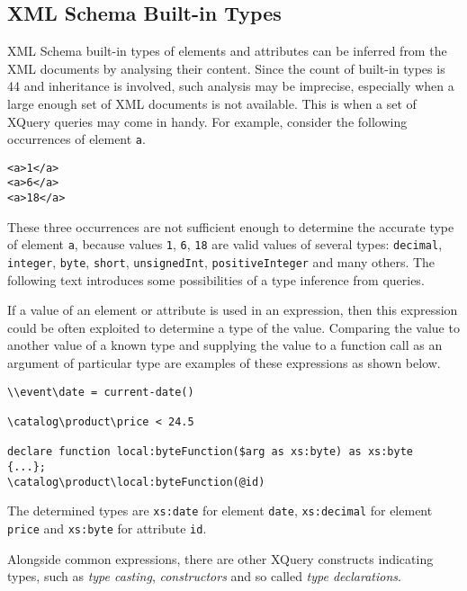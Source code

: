 \subsection{XML Schema Built-in Types}
XML Schema built-in types of elements and attributes can be inferred from the XML documents by analysing their content. Since the count of built-in types is 44 and inheritance is involved, such analysis may be imprecise, especially when a large enough set of XML documents is not available. This is when a set of XQuery queries may come in handy. For example, consider the following occurrences of element \texttt{a}.

\begin{verbatim}
<a>1</a>
<a>6</a>
<a>18</a>
\end{verbatim}

These three occurrences are not sufficient enough to determine the accurate type of element \texttt{a}, because values \texttt{1}, \texttt{6}, \texttt{18} are valid values of several types: \texttt{decimal}, \texttt{integer}, \texttt{byte}, \texttt{short}, \texttt{unsignedInt}, \texttt{positiveInteger} and many others. The following text introduces some possibilities of a type inference from queries.

If a value of an element or attribute is used in an expression, then this expression could be often exploited to determine a type of the value. Comparing the value to another value of a known type and supplying the value to a function call as an argument of particular type are examples of these expressions as shown below.

\begin{verbatim}
\\event\date = current-date()

\catalog\product\price < 24.5

declare function local:byteFunction($arg as xs:byte) as xs:byte
{...};
\catalog\product\local:byteFunction(@id)
\end{verbatim}

The determined types are \texttt{xs:date} for element \texttt{date}, \texttt{xs:decimal} for element \texttt{price} and \texttt{xs:byte} for attribute \texttt{id}.

Alongside common expressions, there are other XQuery constructs indicating types, such as \emph{type casting}, \emph{constructors} and so called \emph{type declarations}.

